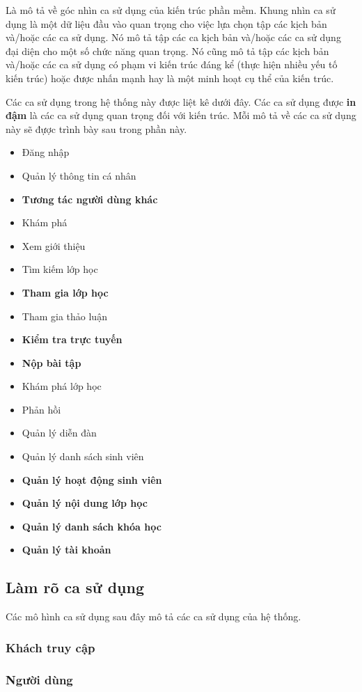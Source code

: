 \documentclass[./../main_file.tex]{subfiles}
\begin{document}
	Là mô tả về góc nhìn ca sử dụng của kiến trúc phần mềm. Khung nhìn ca sử dụng là một dữ liệu đầu
	vào quan trọng cho việc lựa chọn tập các kịch bản và/hoặc các ca sử dụng. Nó mô tả tập các ca kịch 
	bản và/hoặc các ca sử dụng đại diện cho một số chức năng quan trọng. Nó cũng mô tả tập các kịch
	bản và/hoặc các ca sử dụng có phạm vi kiến trúc đáng kể (thực hiện nhiều yếu tố kiến trúc)
	hoặc được nhấn mạnh hay là một minh hoạt cụ thể của kiến trúc.
	
	
	Các ca sử dụng trong hệ thống này được liệt kê dưới đây. Các ca sử dụng được \textbf{in đậm} là 
	các ca sử dụng quan trọng đối với kiến trúc. Mỗi mô tả về các ca sử dụng này sẽ đựợc trình bày 
	sau trong phần này.
	\begin{itemize}
		\item Đăng nhập
		\item Quản lý thông tin cá nhân
		\item \textbf{Tương tác người dùng khác}
		\item Khám phá
		\item Xem giới thiệu
		\item Tìm kiếm lớp học
		\item \textbf{Tham gia lớp học}
		\item Tham gia thảo luận
		\item \textbf{Kiểm tra trực tuyến}
		\item \textbf{Nộp bài tập}
		\item Khám phá lớp học
		\item Phản hồi
		\item Quản lý diễn đàn
		\item Quản lý danh sách sinh viên
		\item \textbf{Quản lý hoạt động sinh viên}
		\item \textbf{Quản lý nội dung lớp học}
		\item \textbf{Quản lý danh sách khóa học}
		\item \textbf{Quản lý tài khoản}
	\end{itemize}

	\subsection{Làm rõ ca sử dụng}
	Các mô hình ca sử dụng sau đây mô tả các ca sử dụng của hệ thống.
	\subsubsection{Khách truy cập}
	\subsubsection{Người dùng}
\end{document}
